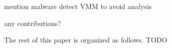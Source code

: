 mention malware detect VMM to avoid analysis

any contributions?

The rest of this paper is organized as follows. TODO

